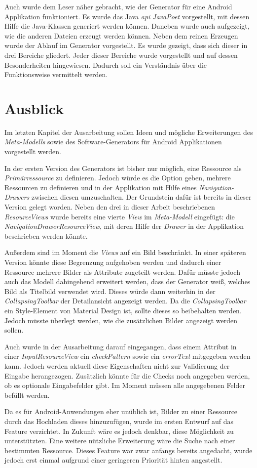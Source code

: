 Auch wurde dem Leser näher gebracht, wie der Generator für eine Android Applikation funktioniert. Es wurde das Java \textit{\acf{api}} \textit{JavaPoet} vorgestellt, mit dessen Hilfe die Java-Klassen generiert werden können. Daneben wurde auch aufgezeigt, wie die anderen Dateien erzeugt werden können. 
Neben dem reinen Erzeugen wurde der Ablauf im Generator vorgestellt. Es wurde gezeigt, dass sich dieser in drei Bereiche gliedert.
Jeder dieser Bereiche wurde vorgestellt und auf dessen Besonderheiten hingewiesen. Dadurch soll ein Verständnis über die Funktionsweise vermittelt werden.  

\section{Ausblick}

Im letzten Kapitel der Ausarbeitung sollen Ideen und mögliche Erweiterungen des \textit{Meta-Modells} sowie des Software-Generators für Android Applikationen vorgestellt werden.

In der ersten Version des Generators ist bisher nur möglich, eine Ressource als \textit{Primärressource} zu definieren. Jedoch würde es die Option geben, mehrere Ressourcen zu definieren und in der Applikation mit Hilfe eines \textit{Navigation-Drawers} zwischen diesen umzuschalten. Der Grundstein dafür ist bereits in dieser Version gelegt worden. Neben den drei in dieser Arbeit beschriebenen \textit{ResourceViews} wurde bereits eine vierte \textit{View} im \textit{Meta-Modell} eingefügt: die \textit{NavigationDrawerResourceView}, mit deren Hilfe der \textit{Drawer} in der Applikation beschrieben werden könnte.

Außerdem sind im Moment die \textit{Views} auf ein Bild beschränkt. In einer späteren Version könnte diese Begrenzung  aufgehoben werden und dadurch einer Ressource mehrere Bilder als Attribute zugeteilt werden. Dafür müsste jedoch auch das Modell dahingehend erweitert werden, dass der Generator weiß, welches Bild als Titelbild verwendet wird. Dieses würde dann weiterhin in der \textit{CollapsingToolbar} der Detailansicht angezeigt werden. Da die \textit{CollapsingToolbar} ein Style-Element von Material Design ist, sollte dieses so beibehalten werden. Jedoch müsste überlegt werden, wie die zusätzlichen Bilder angezeigt werden sollen.

\newpage

Auch wurde in der Ausarbeitung darauf eingegangen, dass einem Attribut in einer \textit{InputResourceView} ein \textit{checkPattern} sowie ein \textit{errorText} mitgegeben werden kann. Jedoch werden aktuell diese Eigenschaften nicht zur Validierung der Eingabe herangezogen. Zusätzlich könnte für die Checks noch angegeben werden, ob es optionale Eingabefelder gibt. Im Moment müssen alle angegebenen Felder befüllt werden.

Da es für Android-Anwendungen eher unüblich ist, Bilder zu einer Ressource durch das Hochladen dieses hinzuzufügen, wurde im ersten Entwurf auf das Feature verzichtet. In Zukunft wäre es jedoch denkbar, diese Möglichkeit zu unterstützten. 
Eine weitere nützliche Erweiterung wäre die Suche nach einer bestimmten Ressource. Dieses Feature war zwar anfangs bereits angedacht, wurde jedoch erst einmal aufgrund einer geringeren Priorität hinten angestellt.